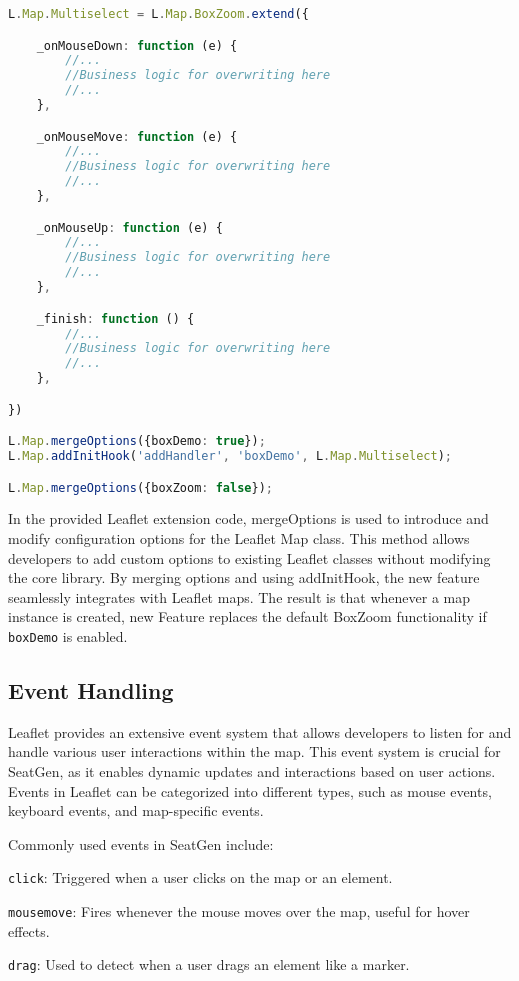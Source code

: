\begin{lstlisting}[language=Typescript, caption={Modifying Leaflet Features},label={lst:leaflet-modification}]
L.Map.Multiselect = L.Map.BoxZoom.extend({

    _onMouseDown: function (e) {
        //...
        //Business logic for overwriting here
        //...
    },

    _onMouseMove: function (e) {
        //...
        //Business logic for overwriting here
        //...
    },

    _onMouseUp: function (e) {
        //...
        //Business logic for overwriting here
        //...
    },

    _finish: function () {
        //...
        //Business logic for overwriting here
        //...
    },

})

L.Map.mergeOptions({boxDemo: true});
L.Map.addInitHook('addHandler', 'boxDemo', L.Map.Multiselect);

L.Map.mergeOptions({boxZoom: false});

\end{lstlisting}


In the provided Leaflet extension code, mergeOptions is used to introduce and modify configuration options for the Leaflet Map class. This method allows developers to add custom options to existing Leaflet classes without modifying the core library. By merging options and using addInitHook, the new feature seamlessly integrates with Leaflet maps. The result is that whenever a map instance is created, new Feature replaces the default BoxZoom functionality if \texttt{boxDemo} is enabled.

\subsection{Event Handling}
Leaflet provides an extensive event system that allows developers to listen for and handle various user interactions within the map. This event system is crucial for SeatGen, as it enables dynamic updates and interactions based on user actions. Events in Leaflet can be categorized into different types, such as mouse events, keyboard events, and map-specific events.

Commonly used events in SeatGen include:
\begin{compactitem}
\item \texttt{click}: Triggered when a user clicks on the map or an element.
\item \texttt{mousemove}: Fires whenever the mouse moves over the map, useful for hover effects.
\item \texttt{drag}: Used to detect when a user drags an element like a marker.
\end{compactitem}

